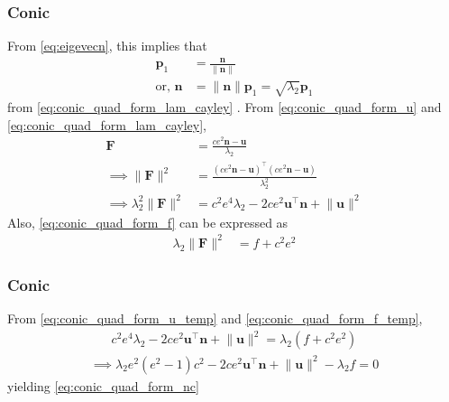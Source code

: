 \documentclass{beamer}
\providecommand{\brak}[1]{\ensuremath{\left(#1\right)}}
\theoremstyle{remark}
\providecommand{\norm}[1]{\lVert#1\rVert}
\let\vec\mathbf
\begin{document}
\begin{frame}
\frametitle{Conic}
	From       \eqref{eq:eigevecn}, this implies that 
\begin{align}  
	\vec{p}_1 &= \frac{\vec{n}}{\norm{\vec{n}}} 
	\\
	\text{or, }
   \vec{n}&= \norm{\vec{n}}\vec{p}_1  = \sqrt{\lambda_2}\vec{p}_1 
\end{align}  
from   \eqref{eq:conic_quad_form_lam_cayley} .
From \eqref{eq:conic_quad_form_u} and \eqref{eq:conic_quad_form_lam_cayley},
\begin{align}
\vec{F}  &= \frac{ce^2\vec{n}-\vec{u}}{\lambda_2}
 \\
 \implies \norm{\vec{F}}^2  &= \frac{\brak{ce^2\vec{n}-\vec{u}}^{\top}\brak{ce^2\vec{n}-\vec{u}}}{\lambda_2^2}
 \\
 \implies \lambda_2^2\norm{\vec{F}}^2  &= c^2e^4\lambda_2-2ce^2\vec{u}^{\top}\vec{n}+\norm{\vec{u}}^2
 \label{eq:conic_quad_form_u_temp}
    \end{align}
    Also, \eqref{eq:conic_quad_form_f} can be expressed as
    \begin{align}
    \lambda_2\norm{\vec{F}}^2 &= f+c^2e^2
    \label{eq:conic_quad_form_f_temp}
\end{align}
\end{frame}
\begin{frame}
\frametitle{Conic}
From  \eqref{eq:conic_quad_form_u_temp} and     \eqref{eq:conic_quad_form_f_temp},
\begin{align}
c^2e^4\lambda_2-2ce^2\vec{u}^{\top}\vec{n}+\norm{\vec{u}}^2 = \lambda_2\brak{f+c^2e^2}
\end{align}
\begin{align}
\implies \lambda_2e^2\brak{e^2-1}c^2-2ce^2\vec{u}^{\top}\vec{n}
	+\norm{\vec{u}}^2 - \lambda_2 f = 0
\end{align}
yielding
\eqref{eq:conic_quad_form_nc} 
\end{frame}







\end{document}
